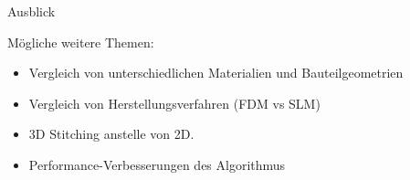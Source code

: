 \documentclass[../slides.tex]{subfiles}
\begin{document}
  \begin{frame}{Ausblick}
    \begin{minipage}[h]{.8\textwidth}
        \begin{block}{Mögliche weitere Themen:}
            \begin{itemize}
                \item Vergleich von unterschiedlichen Materialien
                und Bauteilgeometrien
                \item Vergleich von Herstellungsverfahren (FDM vs SLM)
                \item 3D Stitching anstelle von 2D.
                \item Performance-Verbesserungen des Algorithmus
            \end{itemize}
        \end{block}
    \end{minipage}
    \hfill
    \begin{minipage}[h]{.19\textwidth}       
    \end{minipage}
  \end{frame}
\end{document}
